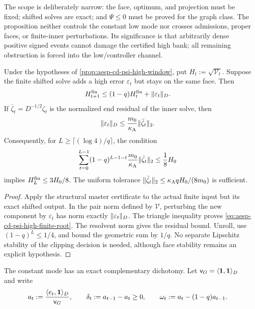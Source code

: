 The scope is deliberately narrow: the face, optimum, and projection must be
fixed; shifted solves are exact; and $\Psi\leq0$ must be proved for the graph
class.  The proposition neither controls the constant low mode nor crosses
admissions, proper faces, or finite-inner perturbations.  Its significance is
that arbitrarily dense positive signed events cannot damage the certified
high bank; all remaining obstruction is forced into the low/controller
channel.

\begin{corollary}
\label{cor:aesp-cd-psi-high-finite}
Under the hypotheses of \cref{prop:aesp-cd-psi-high-window}, put
$H_t:=\sqrt{\mathcal V_t}$.  Suppose the finite shifted solve adds a high
error $\varepsilon_t$ but stays on the same face.  Then
\begin{equation}
 H_{t+1}^{\rm fin}
 \leq(1-q)H_t^{\rm fin}+\lVert\varepsilon_t\rVert_D.
 \label{eq:aesp-cd-psi-high-finite-root}
\end{equation}
If $\bar\zeta_t=D^{-1/2}\zeta_t$ is the normalized end residual of the inner solve,
then
\begin{equation*}
 \lVert\varepsilon_t\rVert_D
 \leq\frac{m_0}{\kappa_{\mathrm A}}\lVert\bar\zeta_t\rVert_2.
\end{equation*}
Consequently, for $L\geq\lceil(\log 4)/q\rceil$, the condition
\begin{equation}
 \sum_{t=0}^{L-1}(1-q)^{L-1-t}
 \frac{m_0}{\kappa_{\mathrm A}}\lVert\bar\zeta_t\rVert_2
 \leq\frac18H_0
 \label{eq:aesp-cd-psi-high-finite-budget}
\end{equation}
implies $H_L^{\rm fin}\leq3H_0/8$.  The uniform tolerance
$\lVert\bar\zeta_t\rVert_2\leq\kappa_{\mathrm A}qH_0/(8m_0)$ is sufficient.
\end{corollary}

\begin{proof}
Apply the structural master certificate to the actual finite input but its
exact shifted output.  In the pair norm defined by $\mathcal V$, perturbing
the new component by $\varepsilon_t$ has norm exactly
$\lVert\varepsilon_t\rVert_D$.  The triangle inequality proves
\cref{eq:aesp-cd-psi-high-finite-root}.  The resolvent norm gives the residual
bound.  Unroll, use $(1-q)^L\leq1/4$, and bound the geometric sum by $1/q$.
No separate Lipschitz stability of the clipping decision is needed, although
face stability remains an explicit hypothesis.
\end{proof}

The constant mode has an exact complementary dichotomy.  Let
$\mathsf v_G=\langle\mathbf{1},\mathbf{1}\rangle_D$ and write
\begin{equation*}
 a_t:=\frac{\langle e_t,\mathbf{1}\rangle_D}{\mathsf v_G},\qquad
 \delta_t:=a_{t-1}-a_t\geq0,\qquad
 \omega_t:=a_t-(1-q)a_{t-1}.
\end{equation*}

